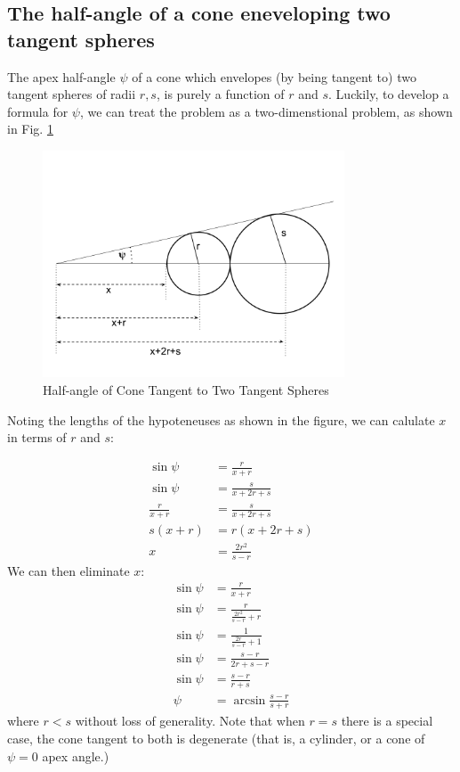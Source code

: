 \documentclass{article}
\begin{document}
\subsection{The half-angle of a cone eneveloping two tangent spheres}

The apex half-angle $\psi$ of a cone which envelopes (by being tangent to) two tangent
spheres of radii $r,s$, is purely a function of $r$ and $s$.
Luckily, to develop a formula for $\psi$, we can treat the problem as a two-dimenstional problem,
as shown in Fig. \ref{fig:conehalf}


\begin{figure}
     \centering
     \includegraphics[width=0.8\textwidth]{figures/HalfAngleOfConeTangenttoTwoTangentSpheres.png}
     \caption{Half-angle of Cone Tangent to Two Tangent Spheres}
  \label{fig:conehalf}
\end{figure}

Noting the lengths of the hypoteneuses as shown in the figure, we
can calulate $x$ in terms of $r$ and $s$:

\begin{align}
  \sin{\psi} &= \frac{r}{x + r} \\
  \sin{\psi} &= \frac{s}{x + 2r + s} \\
  \frac{r}{x + r} &= \frac{s}{x + 2r + s} \\
  s(x + r) &= r(x + 2r + s) \\
  x &= \frac{2r^2}{s - r}
\end{align}
We can then eliminate $x$:
\begin{align}
  \sin{\psi} &= \frac{r}{x + r} \\
  \sin{\psi} &= \frac{r}{\frac{2r^2}{s - r} + r} \\
    \sin{\psi} &= \frac{1}{\frac{2r}{s - r} + 1} \\
      \sin{\psi} &= \frac{s-r}{2r + s - r} \\
    \sin{\psi} &= \frac{s-r}{r + s} \\
 \psi &= \arcsin{\frac{s - r}{s + r}}
\end{align}
where $r < s$ without loss of generality. Note that when $r = s$
there is a special case,
the cone tangent to both is degenerate (that is, a cylinder, or a cone of
$\psi = 0$ apex angle.)
\end{document}
